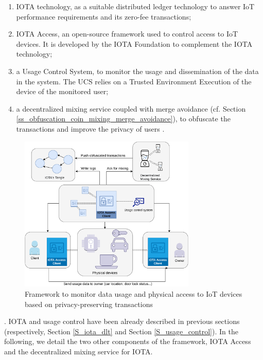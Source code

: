\begin{enumerate}
\item IOTA technology, as a suitable distributed ledger technology to answer IoT performance requirements and its zero-fee transactions;
\item IOTA Access, an open-source framework used to control access to IoT devices. It is developed by the IOTA Foundation to complement the IOTA technology; 
\item a Usage Control System, to monitor the usage and dissemination of the data in the system. The UCS relies on a Trusted Environment Execution of the device of the monitored user;
\item a decentralized mixing service coupled with merge avoidance (cf. Section \ref{ss_obfuscation_coin_mixing_merge_avoidance}), to obfuscate the transactions and improve the privacy of users \cite{Sarfraz2019}.
\end{enumerate}
 \begin{figure}[t]
    \centering
     \includegraphics[width=0.75\textwidth]{Images/framework_IFIP.pdf}
    \caption{Framework to monitor data usage and physical access to IoT devices based on privacy-preserving transactions}
    \label{F_framework_IFIP}
    \end{figure}
  
   \cite{Sarfraz2019}.  
  IOTA and usage control have been already described in previous sections (respectively, Section \ref{S_iota_dlt} and Section \ref{S_usage_control}). In the following, 
  we detail the two other components of the framework, IOTA Access and the decentralized mixing service for IOTA.  
